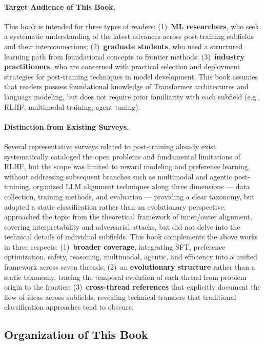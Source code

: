 \paragraph{Target Audience of This Book.}
This book is intended for three types of readers:
(1)~\textbf{ML researchers}, who seek a systematic understanding of the latest advances across post-training subfields and their interconnections;
(2)~\textbf{graduate students}, who need a structured learning path from foundational concepts to frontier methods;
(3)~\textbf{industry practitioners}, who are concerned with practical selection and deployment strategies for post-training techniques in model development.
This book assumes that readers possess foundational knowledge of Transformer architectures and language modeling,
but does not require prior familiarity with each subfield (e.g., RLHF, multimodal training, agent tuning).

\paragraph{Distinction from Existing Surveys.}
Several representative surveys related to post-training already exist.
\citet{casper2023rlhfproblems} systematically cataloged the open problems and fundamental limitations of RLHF,
but the scope was limited to reward modeling and preference learning,
without addressing subsequent branches such as multimodal and agentic post-training.
\citet{wang2023alignsurvey} organized LLM alignment techniques along three dimensions --- data collection, training methods, and evaluation ---
providing a clear taxonomy, but adopted a static classification rather than an evolutionary perspective.
\citet{shen2023alignmentsurvey} approached the topic from the theoretical framework of inner/outer alignment,
covering interpretability and adversarial attacks, but did not delve into the technical details of individual subfields.
This book complements the above works in three respects:
(1)~\textbf{broader coverage}, integrating SFT, preference optimization, safety, reasoning, multimodal, agentic, and efficiency into a unified framework across seven threads;
(2)~an \textbf{evolutionary structure} rather than a static taxonomy, tracing the temporal evolution of each thread from problem origin to the frontier;
(3)~\textbf{cross-thread references} that explicitly document the flow of ideas across subfields, revealing technical transfers that traditional classification approaches tend to obscure.

\subsection{Organization of This Book}
\label{sec:t0-organization}

